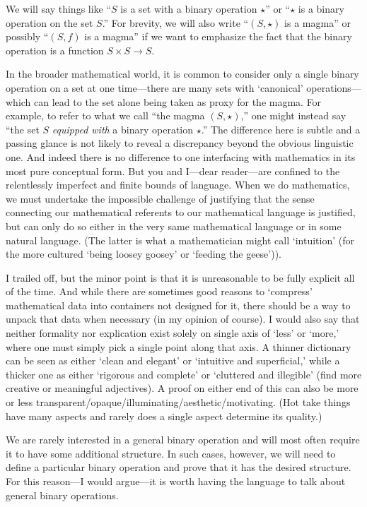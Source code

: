 \documentclass[12pt]{article}
\theoremstyle{definition}
\newcommand{\<}{\left\langle}
\renewcommand{\>}{\right\rangle}
\renewcommand{\_}[1]{{_{#1}}}
\begin{document}
We will say things like ``$S$ is a set with a binary operation $\star$'' or ``$\star$ is a binary operation on the set $S$.''
For brevity, we will also write ``$(S, \star)$ is a magma'' or possibly ``$(S, f)$ is a magma'' if we want to emphasize the fact that the binary operation is a function $S \times S \to S$.

In the broader mathematical world, it is common to consider only a single binary operation on a set at one time---there are many sets with `canonical' operations---which can lead to the set alone being taken as proxy for the magma.
For example, to refer to what we call ``the magma $(S, \star)$,'' one might instead say ``the set $S$ \textit{equipped with} a binary operation $\star$.''
The difference here is subtle and a passing glance is not likely to reveal a discrepancy beyond the obvious linguistic one.
And indeed there is no difference to one interfacing with mathematics in its most pure conceptual form.
But you and I---dear reader---are confined to the relentlessly imperfect and finite bounds of language.
When we do mathematics, we must undertake the impossible challenge of justifying that the sense connecting our mathematical referents to our mathematical language is justified, but can only do so either in the very same mathematical language or in some natural language.
(The latter is what a mathematician might call `intuition' (for the more cultured `being loosey goosey' or `feeding the geese')).

I trailed off, but the minor point is that it is unreasonable to be fully explicit all of the time.
And while there are sometimes good reasons to `compress' mathematical data into containers not designed for it, there should be a way to unpack that data when necessary (in my opinion of course).
I would also say that neither formality nor explication exist solely on single axis of `less' or `more,' where one must simply pick a single point along that axis.
A thinner dictionary can be seen as either `clean and elegant' or `intuitive and superficial,' while a thicker one as either `rigorous and complete' or `cluttered and illegible' (find more creative or meaningful adjectives).
A proof on either end of this can also be more or less transparent/opaque/illuminating/aesthetic/motivating.
(Hot take things have many aspects and rarely does a single aspect determine its quality.)

We are rarely interested in a general binary operation and will most often require it to have some additional structure.
In such cases, however, we will need to define a particular binary operation and prove that it has the desired structure.
For this reason---I would argue---it is worth having the language to talk about general binary operations.
\end{document}
